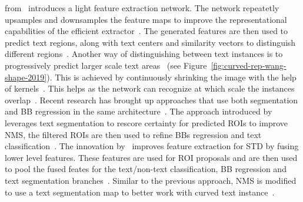 from~\cite{wang_efficient_2019} introduces a light feature extraction network.
The network repeatetly upsamples and downsamples the feature maps to improve the representational
capabilities of the efficient extractor~\citep{wang_efficient_2019}.
The generated features are then used to predict text regions, along with text centers and similarity
vectors to distinguish different regions~\citep{wang_efficient_2019}.
Another way of distinguishing between text instances is to progressively predict larger scale text
areas~\citep{wang_shape_2019} (see Figure~\ref{fig:curved-rep-wang-shape-2019}).
This is achieved by continuously shrinking the image with the help of
kernels~\citep{wang_shape_2019}.
This helps as the network can recognize at which scale the instances overlap~\citep{wang_shape_2019}.
Recent research has brought up approaches that use both segmentation and \ac{BB} regression in the
same architecture~\citep{xie_scene_2018,dai_fused_2018}.
The approach introduced by~\cite{xie_scene_2018} leverages text segmentation to rescore certainty
for predicted \acp{ROI} to improve \ac{NMS}, the filtered \acp{ROI} are then used to refine
\acp{BB} regression and text classification~\citep{xie_scene_2018}.
The innovation by~\cite{dai_fused_2018} improves feature extraction for \ac{STD} by fusing lower
level features.
These features are used for \ac{ROI} proposals and are then used to pool the fused feates for
the text/non-text classification, \ac{BB} regression and text segmentation
branches~\citep{dai_fused_2018}.
Similar to the previous approach, \ac{NMS} is modified to use a text segmentation map to better
work with curved text instance~\citep{dai_fused_2018,xie_scene_2018}.

